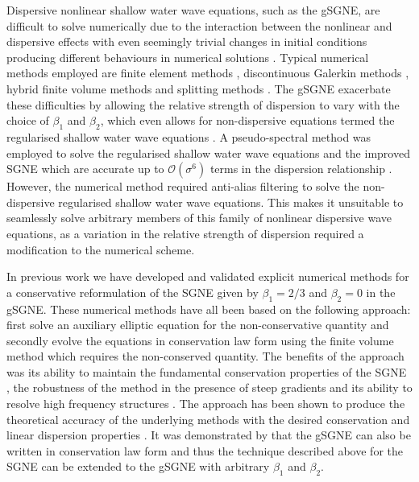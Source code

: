 \documentclass[10pt]{elsarticle}
\begin{document}
Dispersive nonlinear shallow water wave equations, such as the gSGNE, are difficult to solve numerically due to the interaction between the nonlinear and dispersive effects with even seemingly trivial changes in initial conditions producing different behaviours in numerical solutions \cite{Pitt-2018-61}. Typical numerical methods employed are finite element methods \cite{Clamond-et.al-2017-245}, discontinuous Galerkin methods \cite{DONG-2016-110,PANDA-2014-572,LI-2019-108953}, hybrid finite volume methods \cite{Hank-etal-2010-2034,Zoppou-etal-2016} and splitting methods \cite{LANNES-2015-238,Filippini-etal-2016-381,doCarmo-etal-2018-404}. The gSGNE exacerbate these difficulties by allowing the relative strength of dispersion to vary with the choice of $\beta_1$ and $\beta_2$, which even allows for non-dispersive equations termed the regularised shallow water wave equations \cite{Clamond-Dutykh-2018-237}. A pseudo-spectral method  \cite{Dutykh-etal-2013-761} was employed to solve the regularised shallow water wave equations \cite{Clamond-Dutykh-2018-237} and the improved SGNE which are accurate up to $\mathcal{O}\left(\sigma^6\right)$ terms in the dispersion relationship \cite{Clamond-et.al-2017-245}. However, the numerical method required anti-alias filtering to solve the non-dispersive regularised shallow water wave equations. This makes it unsuitable to seamlessly solve arbitrary members of this family of nonlinear dispersive wave equations, as a variation in the relative strength of dispersion required a modification to the numerical scheme.

In previous work we have developed and validated explicit numerical methods for a conservative reformulation of the SGNE \cite{Zoppou-2014,Zoppou-etal-2016,Zoppou-etal-2017,Pitt-2019} given by $\beta_1 = 2/3$ and $\beta_2 =0$ in the gSGNE. These numerical methods have all been based on the following approach: first solve an auxiliary elliptic equation for the non-conservative quantity and secondly evolve the equations in conservation law form using the finite volume method which requires the non-conserved quantity. The benefits of the approach was its ability to maintain the fundamental conservation properties of the SGNE \cite{Pitt-2019}, the robustness of the method in the presence of steep gradients and its ability to resolve high frequency structures \cite{Pitt-2018-61}. The approach has been shown to produce the theoretical accuracy of the underlying methods \cite{Zoppou-etal-2017,Pitt-2019} with the desired conservation and linear dispersion properties \cite{Pitt-2019}. It was demonstrated by \citet{Clamond-Dutykh-2018-237} that the gSGNE can also be written in conservation law form and thus the technique described above for the SGNE can be extended to the gSGNE with arbitrary $\beta_1$ and $\beta_2$. 
\end{document}
